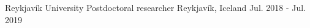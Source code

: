 


\begin{cventries}


  \cventry
  {Reykjavík University} %
  {Postdoctoral researcher} %
  {Reykjavík, Iceland} %
  {Jul. 2018 - Jul. 2019} %
  {
  }


\end{cventries}

\vspace{-2em}
